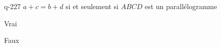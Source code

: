 \begin{truefalse}{q-227}
$a+c=b+d$ si et seulement si $ABCD$ est un parallélogramme
\item* Vrai
\item Faux
\end{truefalse}

